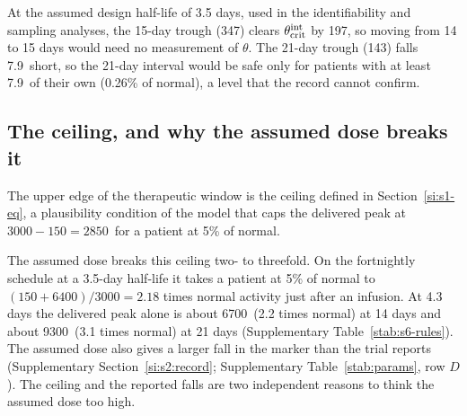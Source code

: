 At the assumed design half-life of 3.5 days, used in the identifiability and sampling analyses,
the 15-day trough (347\um) clears $\theta_{\mathrm{crit}}^{\mathrm{int}}$ by 197\um, so moving from 14 to 15 days would need no
measurement of $\theta$. The 21-day trough (143\um) falls 7.9\um\ short, so the 21-day interval
would be safe only for patients with at least 7.9\um\ of their own (0.26\% of normal), a level
that the record cannot confirm.

\subsection{The ceiling, and why the assumed dose breaks it}
\label{si:s6:ceiling}

The upper edge of the therapeutic window is the ceiling defined in Section~\ref{si:s1-eq}, a
plausibility condition of the model that caps the delivered peak at $3000-150=2850$\um\ for a
patient at 5\% of normal.

The assumed dose breaks this ceiling two- to threefold. On the fortnightly schedule at a 3.5-day
half-life it takes a patient at 5\% of normal to $(150+6400)/3000=2.18$ times normal activity
just after an infusion. At 4.3 days the delivered peak alone is about 6700\um\ (2.2 times
normal) at 14 days and about 9300\um\ (3.1 times normal) at 21 days (Supplementary
Table~\ref{stab:s6-rules}). The assumed dose also gives a larger fall in the marker than the
trial reports (Supplementary Section~\ref{si:s2:record}; Supplementary Table~\ref{stab:params},
row $D$). The ceiling and the reported falls are two independent reasons to think the assumed
dose too high.


